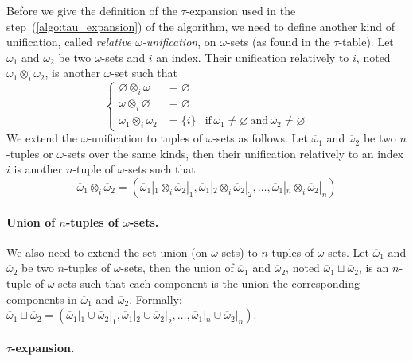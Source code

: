 Before we give the definition of the \(\tau\)-expansion used in the
step~(\ref{algo:tau_expansion}) of the algorithm, we need to define
another kind of unification, called \emph{relative
  \(\omega\)-unification}, on \(\omega\)-sets (as found in the
\(\tau\)-table). Let \(\omega_1\) and \(\omega_2\) be two
\(\omega\)-sets and \(i\) an index. Their unification relatively to
\(i\), noted \(\omega_1 \otimes_i \omega_2\), is another
\(\omega\)-set such that
\[
\left\{
\begin{aligned}
\varnothing \otimes_i \omega &= \varnothing\\
\omega \otimes_i \varnothing &= \varnothing\\
\omega_1 \otimes_i \omega_2  &= \{i\} & \text{if} \, \omega_1 \neq
\varnothing \, \text{and} \, \omega_2 \neq \varnothing
\end{aligned}
\right.
\]
We extend the \(\omega\)-unification to tuples of \(\omega\)-sets as
follows. Let \(\overline{\omega}_1\) and \(\overline{\omega}_2\) be
two \(n\)-tuples or \(\omega\)-sets over the same kinds, then their
unification relatively to an index \(i\) is another \(n\)-tuple of
\(\omega\)-sets such that
\[
\overline{\omega}_1 \otimes_i \overline{\omega}_2 =
(\overline{\omega}_1|_1 \otimes_i \overline{\omega}_2|_1, 
 \overline{\omega}_1|_2 \otimes_i \overline{\omega}_2|_2, \dots,
 \overline{\omega}_1|_n \otimes_i \overline{\omega}_2|_n)
\]


\paragraph{Union of \(n\)-tuples of \(\omega\)-sets.}

We also need to extend the set union (on \(\omega\)-sets) to
\(n\)-tuples of \(\omega\)-sets. Let \(\overline{\omega}_1\) and
\(\overline{\omega}_2\) be two \(n\)-tuples of \(\omega\)-sets, then
the union of \(\overline{\omega}_1\) and \(\overline{\omega}_2\),
noted \(\overline{\omega}_1 \sqcup \overline{\omega}_2\), is an
\(n\)-tuple of \(\omega\)-sets such that each component is the union
the corresponding components in \(\overline{\omega}_1\) and
\(\overline{\omega}_2\). Formally: \(\overline{\omega}_1 \sqcup
\overline{\omega}_2 = (\overline{\omega}_1|_1 \cup
\overline{\omega}_2|_1, \overline{\omega}_1|_2 \cup
\overline{\omega}_2|_2, \dots, \overline{\omega}_1|_n \cup
\overline{\omega}_2|_n)\).


\paragraph{\(\tau\)-expansion.}

